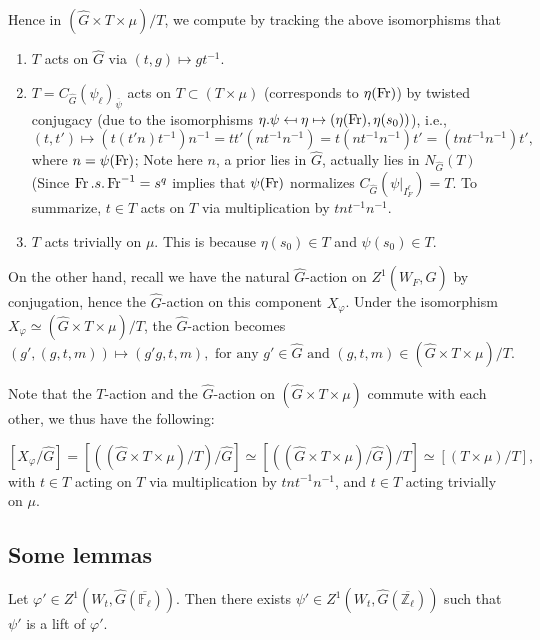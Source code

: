 Hence in $(\hat{G} \times T \times \mu)/T$, we compute by tracking the above isomorphisms that 
\begin{enumerate}
	\item $T$ acts on $\hat{G}$ via $(t, g) \mapsto gt^{-1}$.
	\item $T=C_{\hat{G}}(\psi_{\ell})_{\overline{\psi}}$ acts on $T \subset (T \times \mu)$ (corresponds to $\eta(\operatorname{Fr})$) by twisted conjugacy (due to the isomorphisms $\eta.\psi \mapsfrom \eta \mapsto (\eta(\operatorname{Fr}), \eta(s_0))$), i.e., 
	$$(t, t') \mapsto \left(t(t'n)t^{-1}\right)n^{-1}=tt'(nt^{-1}n^{-1})=t(nt^{-1}n^{-1})t'=(tnt^{-1}n^{-1})t',$$
	where $n=\psi(\operatorname{Fr})$; Note here $n$, a prior lies in $\hat{G}$, actually lies in $N_{\hat{G}}(T)$ (Since $\operatorname{Fr}.s.\operatorname{Fr}^{-1}=s^q$ implies that $\psi(\operatorname{Fr})$ normalizes $C_{\hat{G}}(\psi|_{I_F^{\ell}})=T$. To summarize, $t \in T$ acts on $T$ via multiplication by $tnt^{-1}n^{-1}$.
	\item $T$ acts trivially on $\mu$. This is because $\eta(s_0) \in T$ and $\psi(s_0) \in T$.
\end{enumerate}

On the other hand, recall we have the natural $\hat{G}$-action on $Z^1(W_F, \hat{G})$ by conjugation, hence the $\hat{G}$-action on this component $X_{\varphi}$. Under the isomorphism $X_{\varphi} \simeq (\hat{G} \times T \times \mu)/T$, the $\hat{G}$-action becomes
$$(g', (g, t, m)) \mapsto  (g'g, t, m), \text{ for any } g' \in \hat{G} \text{ and } (g, t, m) \in (\hat{G} \times T \times \mu)/T.$$

Note that the $T$-action and the $\hat{G}$-action on $(\hat{G} \times T \times \mu)$ commute with each other, we thus have the following:

\begin{proposition}\label{T times mu/T}
	$$[X_{\varphi}/\hat{G}]=\left[\left((\hat{G} \times T \times \mu)/T\right)/\hat{G}\right] \simeq \left[\left((\hat{G} \times T \times \mu)/\hat{G}\right)/T\right] \simeq [(T \times \mu)/T],$$ 
	with $t \in T$ acting on $T$ via multiplication by $tnt^{-1}n^{-1}$, and $t \in T$ acting trivially on $\mu$. 
\end{proposition}

\subsection{Some lemmas}

\begin{lemma}\label{Lem generalizing}
	Let $\varphi' \in Z^1(W_t, \hat{G}(\overline{\mathbb{F}_{\ell}}))$. Then there exists $\psi' \in Z^1(W_t, \hat{G}(\overline{\mathbb{Z}_{\ell}}))$ such that $\psi'$ is a lift of $\varphi'$.
\end{lemma}

